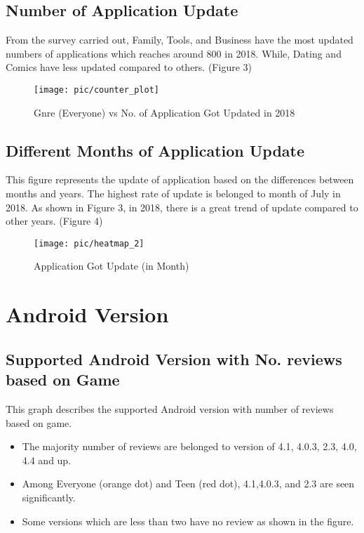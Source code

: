 \subsection*{Number of Application Update}
From the survey carried out, Family, Tools, and Business have the most updated numbers of applications which reaches around 800 in 2018. While, Dating and Comics have less updated compared to others. (Figure 3)  
\begin{figure}
\centering
\texttt{[image: pic/counter\_plot]}
\caption{Gnre (Everyone) vs No. of Application Got Updated in 2018}
\label{fig:3}
\end{figure}

\subsection*{Different Months of Application Update}
This figure represents the update of application based on the differences between months and years. The highest rate of update is belonged to month of July in 2018. As shown in Figure 3, in 2018, there is a great trend of update compared to other years. (Figure 4)
\begin{figure}
\centering
\texttt{[image: pic/heatmap\_2]}
\caption{Application Got Update (in Month)}
\label{fig:4}
\end{figure}

\section*{Android Version}
\subsection*{Supported Android Version with No. reviews based on Game}
This graph describes the supported Android version with number of reviews based on game.
\begin{itemize}
\item The majority number of reviews are belonged to version of 4.1, 4.0.3, 2.3, 4.0, 4.4 and up.\\
\item Among Everyone (orange dot) and Teen (red dot), 4.1,4.0.3, and 2.3 are seen significantly.\\
\item Some versions which are less than two have no review as shown in the figure.\\
\end{itemize}

